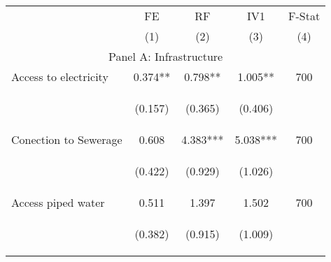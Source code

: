 \begin{tabular}{lcccc}


\hline
\hline


\multicolumn{1}{l}{} & \multicolumn{1}{c}{FE} & \multicolumn{1}{c}{RF} & \multicolumn{1}{c}{IV1} & F-Stat  \\

 & (1) & (2) & (3) & (4)  \\ 
 

\hline

\multicolumn{5}{c}{Panel A: Infrastructure}   \\                                                          

Access to electricity   &  0.374**    &    0.798**   &     1.005**  &  700 \\

\vspace{4pt} &  \begin{footnotesize}(0.157)\end{footnotesize}   &
			    \begin{footnotesize}(0.365)\end{footnotesize}   &
			    \begin{footnotesize}(0.406)\end{footnotesize}   &
			     \\          


Conection to Sewerage   &  0.608    &    4.383***   &     5.038***  &  700  \\

\vspace{4pt} &  \begin{footnotesize}(0.422)\end{footnotesize}   &
			    \begin{footnotesize}(0.929)\end{footnotesize}   &
			    \begin{footnotesize}(1.026)\end{footnotesize}   &
			     \\          


Access piped water  &  0.511    &    1.397   &     1.502  &  700  \\

\vspace{4pt} &  \begin{footnotesize}(0.382)\end{footnotesize}   &
			    \begin{footnotesize}(0.915)\end{footnotesize}   &
			    \begin{footnotesize}(1.009)\end{footnotesize}   &
			     \\          




\end{tabular}
